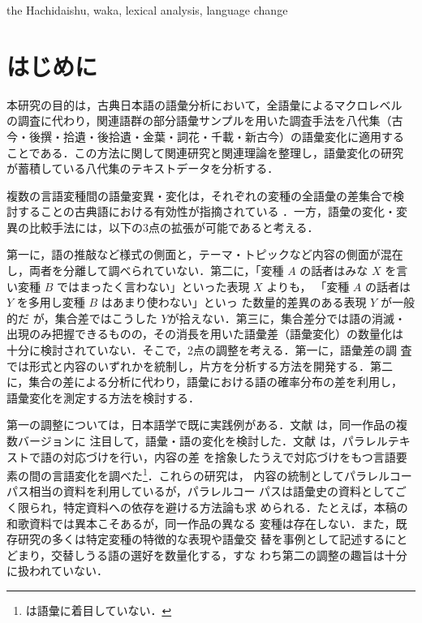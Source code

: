 \documentclass[submit]{ipsj}
\begin{document}
\begin{ekeyword}
the Hachidaishu, waka, lexical analysis, language change
\end{ekeyword}

\maketitle
\section{はじめに\label{orgae2244d}}
\label{sec:orgf77357e}
本研究の目的は，古典日本語の語彙分析において，全語彙によるマクロレベル
の調査に代わり，関連語群の部分語彙サンプルを用いた調査手法を八代集（古
今・後撰・拾遺・後拾遺・金葉・詞花・千載・新古今）の語彙変化に適用する
ことである．この方法に関して関連研究と関連理論を整理し，語彙変化の研究
が蓄積している八代集のテキストデータを分析する．

複数の言語変種間の語彙変異・変化は，それぞれの変種の全語彙の差集合で検
討することの古典語における有効性が指摘されている
\cite{kondo2011Heian,tsukishima1992Kunten}．一方，語彙の変化・変
異の比較手法には，以下の3点の拡張が可能であると考える．

第一に，語の推敲など様式の側面と，テーマ・トピックなど内容の側面が混在
し，両者を分離して調べられていない．第二に，「変種 \(A\) の話者はみな
\(X\) を言い変種 \(B\) ではまったく言わない」といった表現 \(X\) よりも，
「変種 \(A\) の話者は \(Y\) を多用し変種 \(B\) はあまり使わない」といっ
た数量的差異のある表現 \(Y\) が一般的だ \cite{Wolfram2004Social}
が，集合差ではこうした \(Y\)が拾えない．第三に，集合差分では語の消滅・
出現のみ把握できるものの，その消長を用いた語彙差（語彙変化）の数量化は
十分に検討されていない．そこで，2点の調整を考える．第一に，語彙差の調
査では形式と内容のいずれかを統制し，片方を分析する方法を開発する．第二
に，集合の差による分析に代わり，語彙における語の確率分布の差を利用し，
語彙変化を測定する方法を検討する．

第一の調整については，日本語学で既に実践例がある．文献 \cite{miyazima1979Kyosanto,hasumi1991Ichi} は，同一作品の複数バージョンに
注目して，語彙・語の変化を検討した．文献 \cite{kitasaki2024Heike,tanaka2014Konjaku} は，パラレルテキストで語の対応づけを行い，内容の差
を捨象したうえで対応づけをもつ言語要素の間の言語変化を調べた\footnote{\cite{kitasaki2024Heike} は語彙に着目していない．}．これらの研究は，
内容の統制としてパラレルコーパス相当の資料を利用しているが，パラレルコー
パスは語彙史の資料としてごく限られ，特定資料への依存を避ける方法論も求
められる．たとえば，本稿の和歌資料では異本こそあるが，同一作品の異なる
変種は存在しない．また，既存研究の多くは特定変種の特徴的な表現や語彙交
替を事例として記述するにとどまり，交替しうる語の選好を数量化する，すな
わち第二の調整の趣旨は十分に扱われていない．
\end{document}
